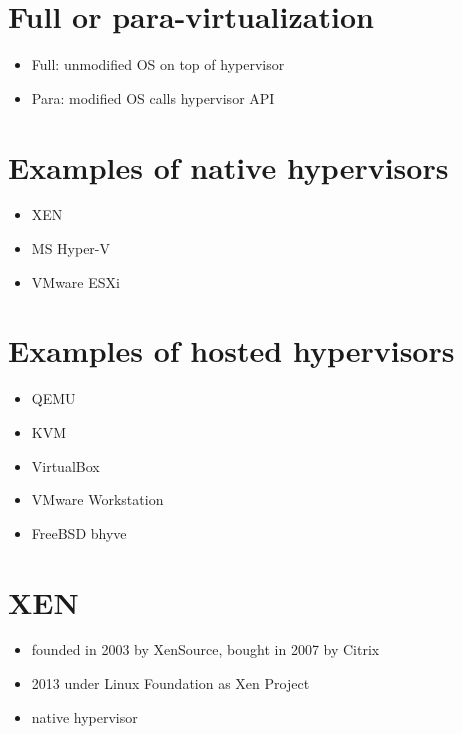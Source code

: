 \documentclass[11pt]{article}
\begin{document}
\section*{Full or para-virtualization}
\label{sec:org054d3ae}
\begin{itemize}
\item Full: unmodified OS on top of hypervisor
\item Para: modified OS calls hypervisor API
\end{itemize}

\section*{Examples of native hypervisors}
\label{sec:org9a22dc6}
\begin{itemize}
\item XEN
\item MS Hyper-V
\item VMware ESXi
\end{itemize}

\section*{Examples of hosted hypervisors}
\label{sec:orgb1e497f}
\begin{itemize}
\item QEMU
\item KVM
\item VirtualBox
\item VMware Workstation
\item FreeBSD bhyve
\end{itemize}

\section*{XEN}
\label{sec:org1a97271}
\begin{itemize}
\item founded in 2003 by XenSource, bought in 2007 by Citrix
\item 2013 under Linux Foundation as Xen Project
\item native hypervisor
\end{itemize}
\end{document}
